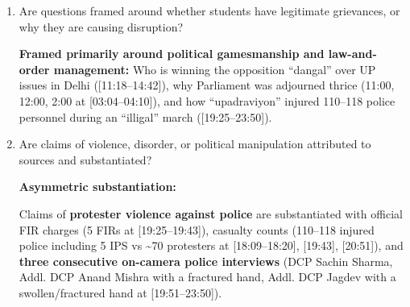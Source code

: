 \documentclass[10pt,a4paper]{article}
\begin{document}
{\begin{enumerate}[leftmargin=1.5em, itemsep=6pt, topsep=4pt]
  \item Are questions framed around whether students have legitimate grievances, or why they are causing disruption?\par\smallskip
  \textbf{Framed primarily around political gamesmanship and law-and-order management:} Who is winning the opposition ``dangal'' over UP issues in Delhi ([11:18--14:42]), why Parliament was adjourned thrice (11:00, 12:00, 2:00 at [03:04--04:10]), and how ``upadraviyon'' injured 110--118 police personnel during an ``illigal'' march ([19:25--23:50]).
  \item Are claims of violence, disorder, or political manipulation attributed to sources and substantiated?\par\smallskip
  \textbf{Asymmetric substantiation:}

  Claims of \textbf{protester violence against police} are substantiated with official FIR charges (5 FIRs at [19:25--19:43]), casualty counts (110--118 injured police including 5 IPS vs \textasciitilde{}70 protesters at [18:09--18:20], [19:43], [20:51]), and \textbf{three consecutive on-camera police interviews} (DCP Sachin Sharma, Addl. DCP Anand Mishra with a fractured hand, Addl. DCP Jagdev with a swollen/fractured hand at [19:51--23:50]).


\end{enumerate}}
\end{document}
